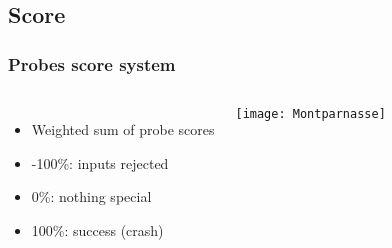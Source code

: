 \subsection{Score}
\frame
{
    \frametitle{Probes score system}
    \begin{columns}[c]
        \column{2.7in}
            \begin{itemize}
            \item Weighted sum of probe scores
            \item -100\%: inputs rejected
            \item 0\%: nothing special
            \item 100\%: success (crash)
            \end{itemize}

        \column{2in}
            \texttt{[image: Montparnasse]}
    \end{columns}
}

